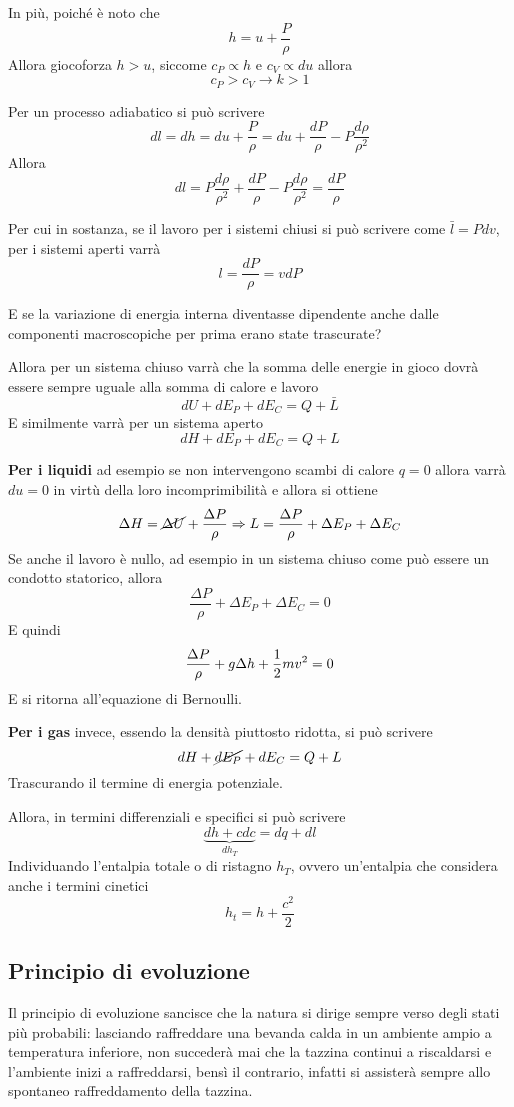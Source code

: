 \begin{adjustwidth}{2in}{}
	In più, poiché è noto che 
	\[h = u + \dfrac{P}{\rho}\]
	Allora giocoforza $h>u$, siccome $c_P\propto h$ e $c_V\propto du$ allora 
	\[c_P>c_V \rightarrow k>1\]
	
	Per un processo adiabatico si può scrivere 
	\[dl=dh = du + \dfrac{P}{\rho} = du + \dfrac{dP}{\rho} - P\dfrac{d\rho}{\rho^2}\]
	Allora 
	\[dl = P\dfrac{d\rho}{\rho^2} + \dfrac{dP}{\rho} - P\dfrac{d\rho}{\rho^2} = \dfrac{dP}{\rho}\]
	
	Per cui in sostanza, se il lavoro per i sistemi chiusi si può scrivere come $\bar{l}=Pdv$, per i sistemi aperti varrà
	\begin{equation}\label{eq:1.10}
		\boxed{l = \dfrac{dP}{\rho} = vdP}
	\end{equation}
	
	E se la variazione di energia interna diventasse dipendente anche dalle componenti macroscopiche per prima erano state trascurate? 
	
	Allora per un sistema chiuso varrà che la somma delle energie in gioco dovrà essere sempre uguale alla somma di calore e lavoro
	\[dU + dE_P + dE_C = Q+\bar{L}\]
	E similmente varrà per un sistema aperto
	\[dH + dE_P + dE_C = Q+L\]
	
	
	\textbf{Per i liquidi} ad esempio se non intervengono scambi di calore $q=0$ allora varrà $du = 0$ in virtù della loro incomprimibilità e allora si ottiene 
	\[\Delta H = \cancel{\Delta U} +  \dfrac{\Delta P}{\rho} \Rightarrow L = \dfrac{\Delta P}{\rho} +\Delta E_P + \Delta E_C \]
	Se anche il lavoro è nullo, ad esempio in un sistema chiuso come può essere un condotto statorico, allora 
	\[\dfrac{\Delta P}{\rho} +\Delta E_P + \Delta E_C = 0 \]
	E quindi
	\[\dfrac{\Delta P}{\rho} +g\Delta h + {1\over2}mv^2 = 0\]
	E si ritorna all'equazione di Bernoulli. \newline
	
	\textbf{Per i gas} invece, essendo la densità piuttosto ridotta, si può scrivere 
	\[dH + \cancel{dE_P}+ dE_C = Q+L\]
	Trascurando il termine di energia potenziale. 
	
	Allora, in termini differenziali e specifici si può scrivere
	\[\underbrace{dh +  cdc}_{dh_T} = dq+dl\]
	Individuando l'entalpia totale o di ristagno $h_T$, ovvero un'entalpia che considera anche i termini cinetici
	\[h_t = h + \dfrac{c^2}{2}\]
	
	\subsection{Principio di evoluzione}
	Il principio di evoluzione sancisce che la natura si dirige sempre verso degli stati più probabili: lasciando raffreddare una bevanda calda in un ambiente ampio a temperatura inferiore, non succederà mai che la tazzina continui a riscaldarsi e l'ambiente inizi a raffreddarsi, bensì il contrario, infatti si assisterà sempre allo spontaneo raffreddamento della tazzina. 
	

\end{adjustwidth}
